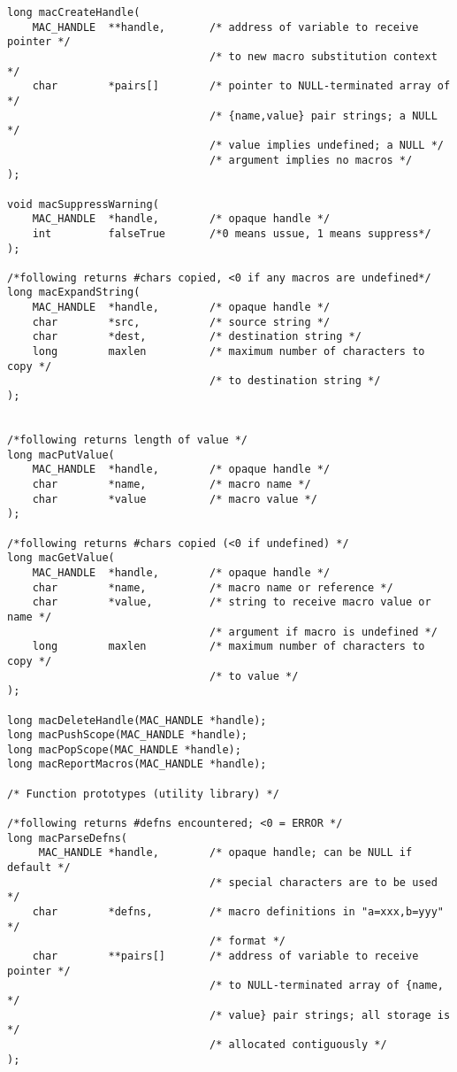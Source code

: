 \begin{verbatim}long macCreateHandle(
    MAC_HANDLE  **handle,       /* address of variable to receive pointer */
                                /* to new macro substitution context */
    char        *pairs[]        /* pointer to NULL-terminated array of */
                                /* {name,value} pair strings; a NULL */
                                /* value implies undefined; a NULL */
                                /* argument implies no macros */
);

void macSuppressWarning(
    MAC_HANDLE  *handle,        /* opaque handle */
    int         falseTrue       /*0 means ussue, 1 means suppress*/
);

/*following returns #chars copied, <0 if any macros are undefined*/
long macExpandString(
    MAC_HANDLE  *handle,        /* opaque handle */
    char        *src,           /* source string */
    char        *dest,          /* destination string */
    long        maxlen          /* maximum number of characters to copy */
                                /* to destination string */
);


/*following returns length of value */
long macPutValue(
    MAC_HANDLE  *handle,        /* opaque handle */
    char        *name,          /* macro name */
    char        *value          /* macro value */
);

/*following returns #chars copied (<0 if undefined) */
long macGetValue(
    MAC_HANDLE  *handle,        /* opaque handle */
    char        *name,          /* macro name or reference */
    char        *value,         /* string to receive macro value or name */
                                /* argument if macro is undefined */
    long        maxlen          /* maximum number of characters to copy */
                                /* to value */
);

long macDeleteHandle(MAC_HANDLE *handle);
long macPushScope(MAC_HANDLE *handle);
long macPopScope(MAC_HANDLE *handle);
long macReportMacros(MAC_HANDLE *handle);

/* Function prototypes (utility library) */

/*following returns #defns encountered; <0 = ERROR */
long macParseDefns(
     MAC_HANDLE *handle,        /* opaque handle; can be NULL if default */
                                /* special characters are to be used */
    char        *defns,         /* macro definitions in "a=xxx,b=yyy" */
                                /* format */
    char        **pairs[]       /* address of variable to receive pointer */
                                /* to NULL-terminated array of {name, */
                                /* value} pair strings; all storage is */
                                /* allocated contiguously */
);


\end{verbatim}
